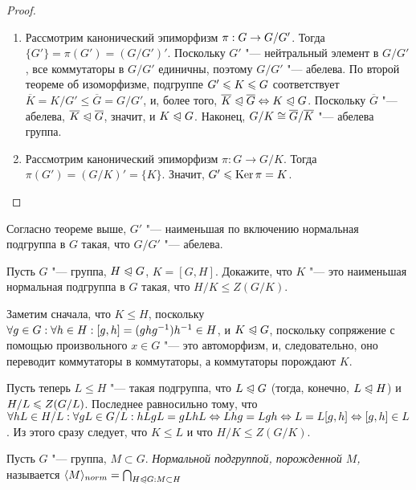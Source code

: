 \begin{proof}~
	\begin{enumerate}
		\item Рассмотрим канонический эпиморфизм $\pi: G \hm\to G / G'$. Тогда $\{G'\} = \pi(G') = (G / G')'$. Поскольку $G'$ "--- нейтральный элемент в $G / G'$, все коммутаторы в $G / G'$ единичны, поэтому $G / G'$ "--- абелева. По второй теореме об изоморфизме, подгруппе $G' \hm\le K \le G$ соответствует $\overline{K} = K / G' \le \overline{G} = G / G'$, и, более того, $\overline{K} \trianglelefteqslant \overline{G} \Leftrightarrow K \trianglelefteqslant G$. Поскольку $\overline{G}$ "--- абелева, $\overline{K} \trianglelefteqslant \overline{G}$, значит, и $K \trianglelefteqslant G$. Наконец, $G / K \hm\cong \overline{G} / \overline{K}$ "--- абелева группа.
		
		\item Рассмотрим канонический эпиморфизм $\pi: G \to G / K$. Тогда $\pi(G') = (G / K)' = \{K\}$. Значит, $G' \leqslant \operatorname{Ker}\pi = K$.
	\end{enumerate}
\end{proof}

\begin{note}
	Согласно теореме выше, $G'$ "--- наименьшая по включению нормальная подгруппа в $G$ такая, что $G / G'$ "--- абелева.
\end{note}

\begin{exercise}
	Пусть $G$ "--- группа, $H \trianglelefteqslant G$, $K = [G, H]$. Докажите, что $K$ "--- это наименьшая нормальная подгруппа в $G$ такая, что $H / K \le Z (G / K)$.
\end{exercise}

\begin{solution}
	Заметим сначала, что $K \le H$, поскольку $\forall g \in G: \forall h \hm\in H: [g, h] = (ghg^{-1})h^{-1} \hm\in H$, и $K \trianglelefteqslant G$, поскольку сопряжение с помощью произвольного $x \in G$ "--- это автоморфизм, и, следовательно, оно переводит коммутаторы в коммутаторы, а коммутаторы порождают $K$.
	
	Пусть теперь $L \le H$ "--- такая подгруппа, что $L \trianglelefteqslant G$ (тогда, конечно, $L \trianglelefteqslant H$) и $H / L \hm\le Z(G / L)$. Последнее равносильно тому, что $\forall hL \in H / L: \forall gL \in G / L: hLgL = gLhL \hm\lra Lhg = Lgh \hm\lra L = L[g, h] \lra [g, h] \in L$. Из этого сразу следует, что $K \le L$ и что $H / K \le Z(G / K)$.
\end{solution}

\begin{definition}
	Пусть $G$ "--- группа, $M \subset G$. \textit{Нормальной подгруппой, порожденной $M$,} называется $\langle M\rangle_{norm} = \bigcap_{H \trianglelefteqslant G: M \subset H}$
\end{definition}

